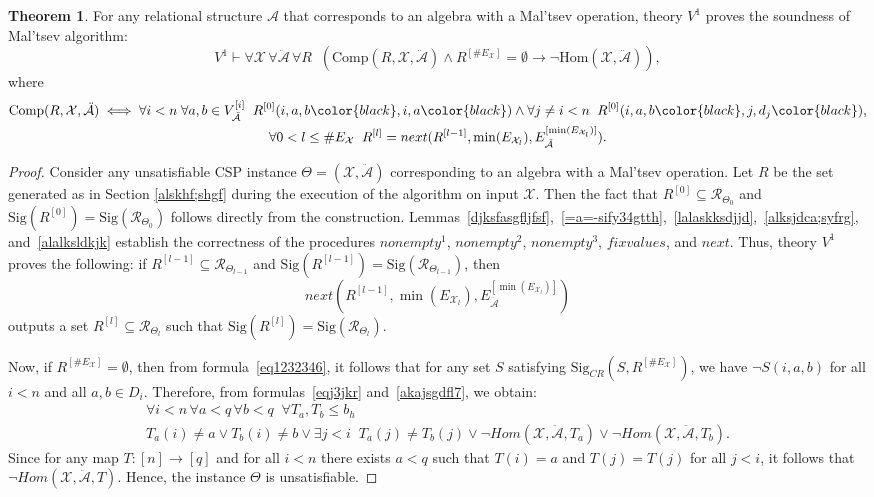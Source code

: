 \documentclass{article}
\newcommand{\bl}{\color{black}}
\theoremstyle{definition}
\theoremstyle{theorem}
\newtheorem{thm}{Theorem}
\theoremstyle{theorem}
\theoremstyle{remark}
\theoremstyle{remark}
\theoremstyle{example}
\theoremstyle{notation}
\theoremstyle{theorem}
\begin{document}
\begin{thm}\label{jkjkajsflageee}
For any relational structure $\mathcal{A}$ that corresponds to an algebra with a Mal'tsev operation, theory $V^1$ proves the soundness of Mal'tsev algorithm:
\[
V^1 \vdash \forall \mathcal{X} \, \forall \ddot{\mathcal{A}} \, \forall R  \;\; \left( \mathrm{Comp}(R, \mathcal{X}, \ddot{\mathcal{A}}) \wedge R^{[\#E_{\mathcal{X}}]} = \emptyset \longrightarrow \neg \mathrm{Hom}(\mathcal{X}, \ddot{\mathcal{A}}) \right),
\]
where
\begin{gather*}
\mathrm{Comp}(R, \mathcal{X}, \ddot{\mathcal{A}}) \iff \forall i < n \; \forall a, b \in V^{[i]}_{\ddot{\mathcal{A}}} \;\;
R^{[0]}(i, a, b\bl, i, a\bl) \wedge \forall j \neq i < n \;\; R^{[0]}(i, a, b\bl, j, d_j\bl), \\
\forall 0 < l \leq \#E_{\mathcal{X}} \;\; R^{[l]} = next(R^{[l-1]}, \min(E_{\mathcal{X}_l}), E^{[\min(E_{\mathcal{X}_l})]}_{\ddot{\mathcal{A}}}).
\end{gather*}
\end{thm}
\begin{proof}
Consider any unsatisfiable CSP instance $\Theta = (\mathcal{X}, \ddot{\mathcal{A}})$ corresponding to an algebra with a Mal'tsev operation. Let $R$ be the set generated as in Section \ref{alskhf;shgf} during the execution of the algorithm on input $\mathcal{X}$. Then the fact that $R^{[0]} \subseteq \mathscr{R}_{\Theta_0}$ and $\mathrm{Sig}(R^{[0]}) = \mathrm{Sig}(\mathscr{R}_{\Theta_0})$ follows directly from the construction. Lemmas~\ref{djksfasgfljfsf},~\ref{=a=-sify34gtth},~\ref{lalaskksdjjd},~\ref{alksjdca;syfrg}, and~\ref{alalksldkjk} establish the correctness of the procedures $nonempty^1$, $nonempty^2$, $nonempty^3$, $fixvalues$, and $next$. Thus, theory $V^1$ proves the following: if $R^{[l-1]} \subseteq \mathscr{R}_{\Theta_{l-1}}$ and $\mathrm{Sig}(R^{[l-1]}) = \mathrm{Sig}(\mathscr{R}_{\Theta_{l-1}})$, then
$$next(R^{[l-1]}, \min(E_{\mathcal{X}_l}), E^{[\min(E_{\mathcal{X}_l})]}_{\ddot{\mathcal{A}}})$$
outputs a set $R^{[l]} \subseteq \mathscr{R}_{\Theta_l}$ such that $\mathrm{Sig}(R^{[l]}) = \mathrm{Sig}(\mathscr{R}_{\Theta_l})$.

Now, if $R^{[\#E_{\mathcal{X}}]} = \emptyset$, then from formula~\eqref{eq1232346}, it follows that for any set $S$ satisfying $\mathrm{Sig}_{CR}(S, R^{[\#E_{\mathcal{X}}]})$, we have $\neg S(i, a, b)$ for all $i < n$ and all $a, b \in D_i$. Therefore, from formulas~\eqref{eqj3jkr} and~\eqref{akajsgdfl7}, we obtain:
\begin{gather*}
\forall i < n \, \forall a<q \, \forall b < q \;\; 
\forall T_a, T_b \leq b_h \\
T_a(i) \neq a \vee T_b(i) \neq b \vee \exists j < i \;\; T_a(j) \neq T_b(j) \vee \neg Hom(\mathcal{X}, \ddot{\mathcal{A}}, T_a) \vee \neg Hom(\mathcal{X}, \ddot{\mathcal{A}}, T_b).
\end{gather*}
Since for any map $T : [n] \to [q]$ and for all $i < n$ there exists $a < q$ such that $T(i) = a$ and $T(j) = T(j)$ for all $j < i$, it follows that $\neg Hom(\mathcal{X}, \ddot{\mathcal{A}}, T)$. Hence, the instance $\Theta$ is unsatisfiable.

\end{proof}
\end{document}
